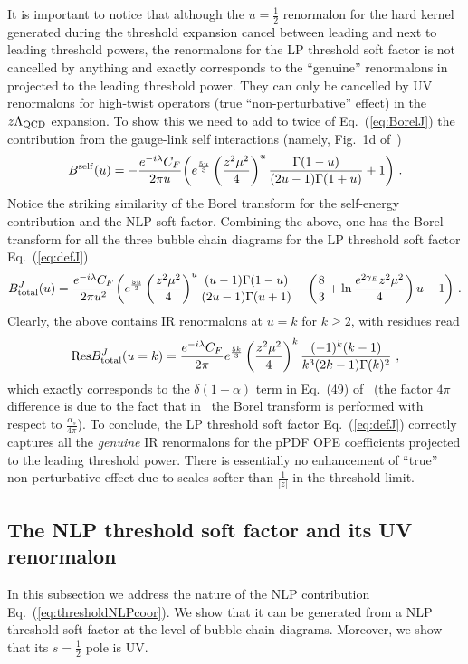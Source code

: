 \documentclass[a4paper,11pt]{article}
\begin{document}
It is important to notice that although the $u=\frac{1}{2}$ renormalon for the hard kernel generated during the threshold expansion cancel between leading and next to leading threshold powers, the renormalons for the LP threshold soft factor is not cancelled by anything and exactly corresponds to the ``genuine'' renormalons in~\cite{Braun:2018brg} projected to the leading threshold power. They can only be cancelled by UV renormalons for high-twist operators (true ``non-perturbative'' effect) in the $z\Lambda_{\rm QCD}$ expansion. To show this we need to add to twice of Eq.~(\ref{eq:BorelJ}) the contribution from the gauge-link self interactions (namely, Fig.~1d of~\cite{Braun:2018brg})
\begin{align}
B^{\rm self}(u)=-\frac{e^{-i \lambda } C_F}{2 \pi u} \bigg( e^{\frac{5u}{3}} \left(\frac{z^2 \mu ^2}{4 }\right)^u \frac{\Gamma (1-u) }{(2u-1)\Gamma (1+u)}+1\bigg) \ .
\end{align}
Notice the striking similarity of the Borel transform for the self-energy contribution and the NLP soft factor. Combining the above, one has the Borel transform for all the three bubble chain diagrams for the LP threshold soft factor Eq.~(\ref{eq:defJ})
\begin{align}
B^{J}_{\rm total}(u)=\frac{e^{-i\lambda }C_F}{2\pi u^2 }\bigg( e^{\frac{5u}{3}} \left(\frac{z^2 \mu ^2}{4 }\right)^u\frac{(u-1) \Gamma (1-u)}{(2 u-1) \Gamma (u+1)}-\left(\frac{8}{3}+\ln \frac{e^{2\gamma_E}z^2\mu^2}{4}\right)u-1\bigg) \ .
\end{align}
Clearly, the above contains IR renormalons at $u=k$ for $k \ge 2$, with residues read
\begin{align}
{\rm Res}B^{J}_{\rm total}(u=k)=\frac{e^{-i\lambda }C_F}{2\pi } e^{\frac{5k}{3}} \left(\frac{z^2 \mu ^2}{4 }\right)^k \frac{(-1)^k (k-1)}{k^3 (2 k-1) \Gamma (k)^2} \ ,
\end{align}
which exactly corresponds to the $\delta(1-\alpha)$ term in Eq.~(49) of~\cite{Braun:2018brg} (the factor $4\pi$ difference is due to the fact that in~\cite{Braun:2018brg} the Borel transform is performed with respect to $\frac{\alpha_s}{4\pi}$). To conclude, the LP threshold soft factor Eq.~(\ref{eq:defJ}) correctly captures all the {\it genuine} IR renormalons for the pPDF OPE coefficients projected to the leading threshold power. There is essentially no enhancement of ``true'' non-perturbative effect due to scales softer than $\frac{1}{|z|}$ in the threshold limit. 


\subsection{The NLP threshold soft factor and its UV renormalon} \label{sec: UVrenor}
In this subsection we address the nature of the NLP contribution Eq.~(\ref{eq:thresholdNLPcoor}). We show that it can be generated from a NLP threshold soft factor at the level of bubble chain diagrams. Moreover, we show that its  $s=\frac{1}{2}$ pole is UV.  
\end{document}
